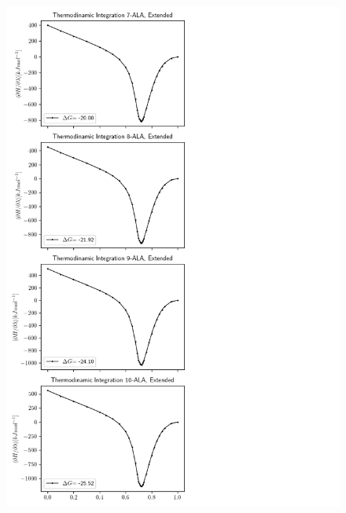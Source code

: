 \begin{figure}[h]
    \centering
    \includegraphics[scale=0.7]{Figures/Chapter_7/TI_curves_3.png}
    \label{fig:my_label}
\end{figure}
\newpage
